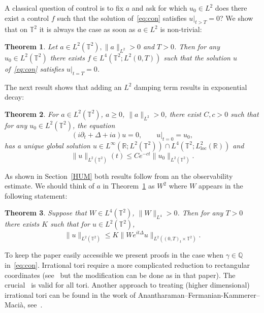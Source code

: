 \documentclass[10pt]{amsart}
\newtheorem{theo}{Theorem}[section]
\theoremstyle{definition}\newtheorem{defi}[theo]{Definition}\newtheorem{rema}[theo]{Remark}\newtheorem{exam}[theo]{Example}\newtheorem{exem}[theo]{Example}\newtheorem{nota}[theo]{Notation}
\newcommand{\R}{{\mathbb R}}
\newcommand{\TT}{{\mathbb T}}
\newcommand{\loc}{\mathrm{loc}}
\begin{document}
A classical question of control is to fix $ a $ and ask for which $u_0 \in L^2$ does there exist a control $f$ such that the solution of~\eqref{eq:con} satisfies $u |_{t>T} =0$? We show that on $\mathbb{T}^2$ it is always the case as soon as $a \in L^2$ is non-trivial:

\begin{theo}\label{th.2}
Let $a \in L^2(\TT^2), \| a \|_{L^2} >0$ and $ T > 0 $. Then for any $u_0\in L^2(\TT^2)$ there exists $f \in L^4(\TT^2 ; L^2(0,T))$ such that the solution $u$ of~\eqref{eq:con} satisfies $u |_{t=T} =0$.
\end{theo}

The next result shows that adding an $ L^2 $ damping term results in exponential decay:


\begin{theo}\label{th.3}
For $a\in L^2(\TT^2)$, $ a \geq 0 $, $ \| a \|_{L^2} > 0$, there exist $C, c>0$ such that for any $u_0 \in L^2(\TT^2)$, the equation
\begin{equation}\label{damped}
(i \partial_t + \Delta + ia) u=0, \qquad u |_{t=0} = u_0,
\end{equation}
has a unique global solution $ u \in L^\infty(\R; L^2(\TT^2))\cap L^4(\TT^2; L^2_{\loc}(\R)) $ and
\begin{equation}\label{dampedbis}
\| u\|_{L^2(\TT^2)} (t) \leq C e^{-ct} \| u_0 \|_{L^2(\TT^2)}.
\end{equation}
\end{theo}


As shown in Section~\ref{HUM} both results follow from an the observability estimate. We should think of $ a $ in Theorem~\ref{th.2} as $ W^2 $ where $ W $ appears in the following statement:

\begin{theo}\label{th.1}
Suppose that $ W \in L^4 (\TT^2) $, $ \| W \|_{L^4} >0 $. Then for any $ T > 0$ there exists $ K $ such that for $ u \in L^2 (\TT^2) $,
\begin{equation}\label{eq:th1}
\| u \|_{ L^2 (\TT^2) } \leq K \| W e^{ it \Delta} u \|_{ L^2 ((0,T)_t \times \TT^2) }.
\end{equation}
\end{theo}

To keep the paper easily accessible we present proofs in the case when $ \gamma \in \mathbb Q $ in~\eqref{eq:con}. Irrational tori require a more complicated reduction to rectangular coordinates (see~\cite[Lemma~2.7 and Figure~1]{BZ4} but the modification can be done as in that paper). The crucial~\cite[Proposition~2.2]{BBZ} is valid for all tori. Another approach to treating (higher dimensional) irrational tori can be found in the work of Anantharaman--Fermanian-Kammerer--Macià, see~\cite[Corollary~1.19, Theorem~1.20]{AFM}.
\end{document}
